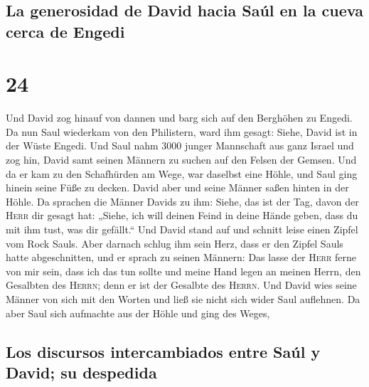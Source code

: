 \hypertarget{la-generosidad-de-david-hacia-sauxfal-en-la-cueva-cerca-de-engedi}{%
\subsection{La generosidad de David hacia Saúl en la cueva cerca de
Engedi}\label{la-generosidad-de-david-hacia-sauxfal-en-la-cueva-cerca-de-engedi}}

\hypertarget{section-23}{%
\section{24}\label{section-23}}

 Und David zog hinauf von dannen und barg sich auf den
Berghöhen zu Engedi.  Da nun Saul wiederkam von den
Philistern, ward ihm gesagt: Siehe, David ist in der Wüste Engedi.
 Und Saul nahm 3000 junger Mannschaft aus ganz Israel und
zog hin, David samt seinen Männern zu suchen auf den Felsen der Gemsen.
 Und da er kam zu den Schafhürden am Wege, war daselbst
eine Höhle, und Saul ging hinein seine Füße zu decken. David aber und
seine Männer saßen hinten in der Höhle.  Da sprachen die
Männer Davids zu ihm: Siehe, das ist der Tag, davon der \textsc{Herr}
dir gesagt hat: „Siehe, ich will deinen Feind in deine Hände geben, dass
du mit ihm tust, was dir gefällt.`` Und David stand auf und schnitt
leise einen Zipfel vom Rock Sauls.  Aber darnach schlug
ihm sein Herz, dass er den Zipfel Sauls hatte abgeschnitten,
 und er sprach zu seinen Männern: Das lasse der
\textsc{Herr} ferne von mir sein, dass ich das tun sollte und meine Hand
legen an meinen Herrn, den Gesalbten des \textsc{Herrn}; denn er ist der
Gesalbte des \textsc{Herrn}.  Und David wies seine Männer
von sich mit den Worten und ließ sie nicht sich wider Saul auflehnen. Da
aber Saul sich aufmachte aus der Höhle und ging des Weges,

\hypertarget{los-discursos-intercambiados-entre-sauxfal-y-david-su-despedida}{%
\subsection{Los discursos intercambiados entre Saúl y David; su
despedida}\label{los-discursos-intercambiados-entre-sauxfal-y-david-su-despedida}}

